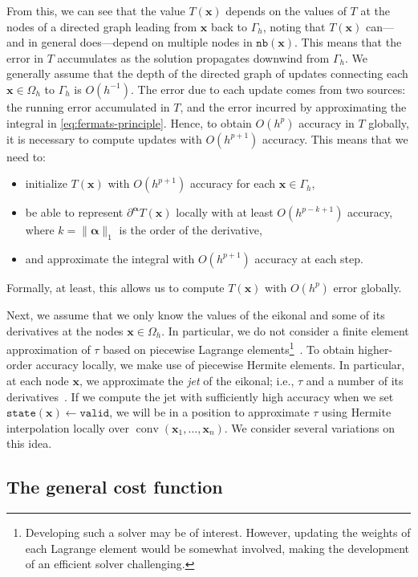 \documentclass{siamart190516}
\newcommand{\m}[1]{\boldsymbol{#1}}
\newcommand{\nb}{\texttt{nb}}
\newcommand{\state}{\texttt{state}}
\newcommand{\valid}{\texttt{valid}}
\DeclareMathOperator{\conv}{conv}
\begin{document}
From this, we can see that the value $T(\m{x})$ depends on the values
of $T$ at the nodes of a directed graph leading from $\m{x}$ back to
$\Gamma_h$, noting that $T(\m{x})$ can---and in general does---depend
on multiple nodes in $\nb(\m{x})$. This means that the error in $T$
accumulates as the solution propagates downwind from $\Gamma_h$. We
generally assume that the depth of the directed graph of updates
connecting each $\m{x} \in \Omega_h$ to $\Gamma_h$ is $O(h^{-1})$. The
error due to each update comes from two sources: the running error
accumulated in $T$, and the error incurred by approximating the
integral in \eqref{eq:fermats-principle}. Hence, to obtain $O(h^p)$
accuracy in $T$ globally, it is necessary to compute updates with
$O(h^{p+1})$ accuracy. This means that we need to:
\begin{itemize}
\item initialize $T(\m{x})$ with $O(h^{p+1})$
accuracy for each $\m{x} \in \Gamma_h$,
\item be able to represent $\partial^{\m{\alpha}} T(\m{x})$ locally
  with at least $O(h^{p-k+1})$ accuracy, where $k = \|\m{\alpha}\|_1$ is the order of the derivative,
\item and approximate the integral
with $O(h^{p+1})$ accuracy at each step.
\end{itemize}
Formally, at least, this allows us to compute $T(\m{x})$ with $O(h^p)$
error globally.

Next, we assume that we only know the values of the eikonal and some
of its derivatives at the nodes $\m{x} \in \Omega_h$. In particular,
we do not consider a finite element approximation of $\tau$ based on
piecewise Lagrange elements\footnote{Developing such a solver may be
  of interest. However, updating the weights of each Lagrange element
  would be somewhat involved, making the development of an efficient
  solver challenging.}~\cite{Prenter:2008aa}. To obtain higher-order
accuracy locally, we make use of piecewise Hermite elements. In
particular, at each node $\m{x}$, we approximate the \emph{jet} of the
eikonal; i.e., $\tau$ and a number of its
derivatives~\cite{Shilov:1971aa}. If we compute the jet with
sufficiently high accuracy when we set $\state(\m{x}) \gets \valid$,
we will be in a position to approximate $\tau$ using Hermite
interpolation locally over $\conv(\m{x}_1, \hdots, \m{x}_n)$. We
consider several variations on this idea.

\subsection{The general cost function}
\end{document}
